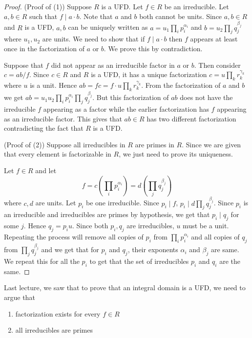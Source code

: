 \begin{proof}
	(Proof of (1)) Suppose $R$ is a UFD. Let $f \in R$ be an irreducible.
	Let $a,b \in R$ such that $f \mid a\cdot b$. Note that $a$ and $b$
	both cannot be units. Since $a,b \in R$ and $R$
	is a UFD, $a,b$ can be uniquely written as $a = u_1 \prod_i
	p_i^{\alpha_i}$ and $b = u_2 \prod_j q_j^{\beta_j}$ where $u_1,u_2$ are
	units. We need to show that if $f \mid a\cdot b$ then $f$ appears at
	least once in the factorization of $a$ or $b$. We prove this by
	contradiction.

	Suppose that $f$ did not appear as an irreducible factor in $a$ or
	$b$. Then consider $c = ab/f$. Since $c \in R$ and $R$ is a UFD, it
	has a unique factorization $c = u \prod_k r_k^{\gamma_k}$ where $u$ is
	a unit. Hence $ab =fc = f \cdot u\prod_k r_k^{\gamma_k} $. From the
	factorization of $a$ and $b$ we get $ab = u_1u_2 \prod_i p_i^{\alpha_i} 
	\prod_j q_j^{\beta_j}$. But this factorization of $ab$ does not have the
	irreducible $f$ appearing as a factor while the earlier factorization
	has $f$ appearing as an irreducible factor. This gives that $ab \in R$
	has two different factorization contradicting the fact that $R$ is a
	UFD.

	(Proof of (2)) Suppose all irreducibles in $R$ are primes in $R$. Since
	we are given that every element is factorizable in $R$, we just need
	to prove its uniqueness. 

	Let $f \in R$ and let \[ f = c \left( \prod_i p_i^{\alpha_i} \right) = d
	\left( \prod_j q_j^{\beta_j} \right) \]
	where $c,d$ are units. Let $p_i$ be one irreducible. Since $p_i \mid
	f$, $p_i \mid d \prod_j q_j^{\beta_j}$. Since $p_i$ is an irreducible
	and irreducibles are primes  by hypothesis, we get that $p_i \mid q_j$
	for some $j$. Hence $q_j = p_i u$. Since both $p_i, q_j$ are
	irreducibles, $u$ must be a unit. Repeating the process will
	remove all copies of $p_i$ from $\prod_i p_i^{\alpha_i}$ and all
	copies of $q_j$ from $\prod_j q_j^{\beta_j}$ and we get that for $p_i$
	and $q_j$, their exponents $\alpha_i$ and $\beta_j$ are same. We
	repeat this for all the $p_i$ to get that the set of irreducibles
	$p_i$ and $q_i$ are the same.
\end{proof}



Last lecture, we saw that to prove that an integral domain is a UFD, we need
to argue that
\begin{enumerate}
	\item factorization exists for every $f \in R$
	\item all irreducibles are primes
\end{enumerate}

